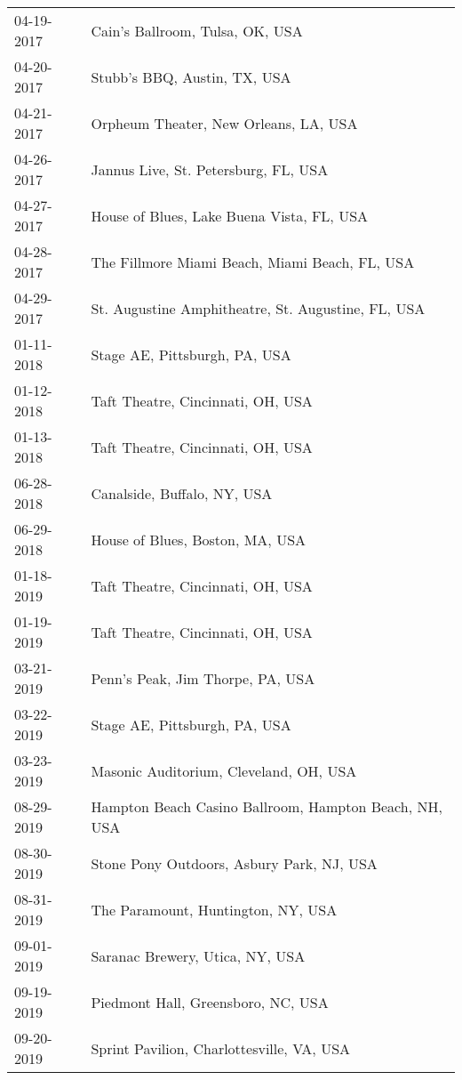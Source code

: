 \begin{supertabular}{ll}
 04-19-2017 &                        Cain's Ballroom, Tulsa, OK, USA \\
 04-20-2017 &                           Stubb's BBQ, Austin, TX, USA \\
 04-21-2017 &                  Orpheum Theater, New Orleans, LA, USA \\
 04-26-2017 &                   Jannus Live, St. Petersburg, FL, USA \\
 04-27-2017 &              House of Blues, Lake Buena Vista, FL, USA \\
 04-28-2017 &         The Fillmore Miami Beach, Miami Beach, FL, USA \\
 04-29-2017 &     St. Augustine Amphitheatre, St. Augustine, FL, USA \\
 01-11-2018 &                          Stage AE, Pittsburgh, PA, USA \\
 01-12-2018 &                      Taft Theatre, Cincinnati, OH, USA \\
 01-13-2018 &                      Taft Theatre, Cincinnati, OH, USA \\
 06-28-2018 &                            Canalside, Buffalo, NY, USA \\
 06-29-2018 &                        House of Blues, Boston, MA, USA \\
 01-18-2019 &                      Taft Theatre, Cincinnati, OH, USA \\
 01-19-2019 &                      Taft Theatre, Cincinnati, OH, USA \\
 03-21-2019 &                       Penn's Peak, Jim Thorpe, PA, USA \\
 03-22-2019 &                          Stage AE, Pittsburgh, PA, USA \\
 03-23-2019 &                 Masonic Auditorium, Cleveland, OH, USA \\
 08-29-2019 &  Hampton Beach Casino Ballroom, Hampton Beach, NH, USA \\
 08-30-2019 &              Stone Pony Outdoors, Asbury Park, NJ, USA \\
 08-31-2019 &                     The Paramount, Huntington, NY, USA \\
 09-01-2019 &                        Saranac Brewery, Utica, NY, USA \\
 09-19-2019 &                     Piedmont Hall, Greensboro, NC, USA \\
 09-20-2019 &              Sprint Pavilion, Charlottesville, VA, USA \\
\end{supertabular}
